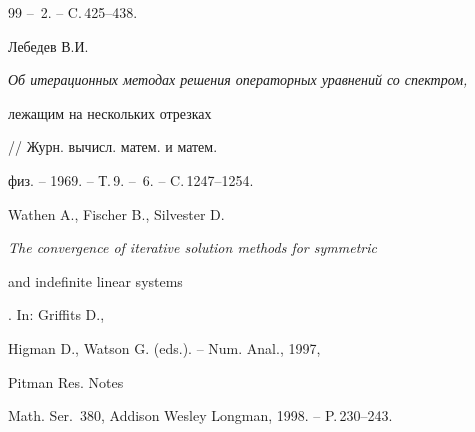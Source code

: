\begin{thebibliography}{99}
-- \No\,2. -- C.\,425--438.







Лебедев В.И.


{\em Об итерационных методах решения операторных уравнений со спектром,


лежащим на нескольких отрезках} // Журн. вычисл. матем. и матем.


физ. -- 1969. -- Т.\,9. -- \No\,6. -- C.\,1247--1254.







Wathen A., Fischer B., Silvester D.


{\em The convergence of iterative solution methods for symmetric


and indefinite linear systems}. In: Griffits D.,


Higman D., Watson G. (eds.). -- Num. Anal., 1997,


Pitman Res. Notes 


Math. Ser.~380, Addison Wesley Longman, 1998. -- P.\,230--243. 





\end{thebibliography}





\vskip 2cm












\label{end}





